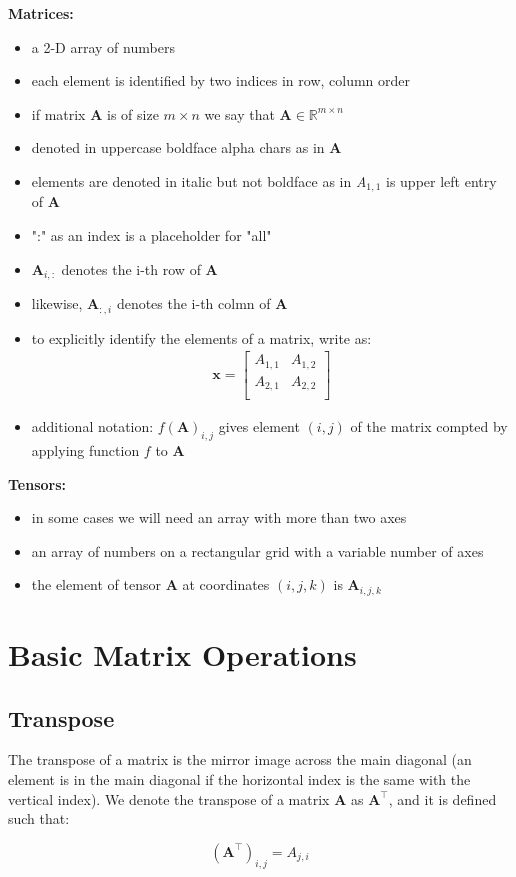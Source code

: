 \documentclass[11pt,twocolumn]{report}
\def\realnumbers{\mathbb{R}}
\begin{document}
\large\textbf{Matrices:}
\begin{itemize}
  \item a 2-D array of numbers
  \item each element is identified by two indices in row, column order
  \item if matrix $\bm{A}$ is of size $m \times n$ we say that $\bm{A} \in
    \realnumbers^{m \times n}$
  \item denoted in uppercase boldface alpha chars as in $\bm{A}$
  \item elements are denoted in italic but not boldface as in
    \textit{A}$_{1,1}$ is upper left entry of $\bm{A}$
  \item ":" as an index is a placeholder for "all"
  \item $\bm{A}_{i,:}$ denotes the i-th row of $\bm{A}$
  \item likewise, $\bm{A}_{:,i}$ denotes the i-th colmn of $\bm{A}$
  \item to explicitly identify the elements of a matrix, write as:
    \begin{gather}
      \bm{x} = 
      \begin{bmatrix}
        A_{1,1} & A_{1, 2}\\
        A_{2,1} & A_{2, 2}\\
      \end{bmatrix}
    \end{gather}
  \item additional notation: $f(\bm{A})_{i, j}$ gives element $(i, j)$ of the
    matrix compted by applying function $f$ to $\bm{A}$
\end{itemize}

\large\textbf{Tensors:}
\begin{itemize}
  \item in some cases we will need an array with more than two axes
  \item an array of numbers on a rectangular grid with a variable number of axes
  \item the element of tensor $\bm{A}$ at coordinates $(i, j, k)$ is
    $\bm{A}_{i, j, k}$
\end{itemize}

\section{Basic Matrix Operations}
\subsection{Transpose}
\begin{flushleft}
  The transpose of a matrix is the mirror image across the main diagonal (an
  element is in the main diagonal if the horizontal index is the same with the
  vertical index). We denote the transpose of a matrix $\bm{A}$ as
  $\bm{A}^\intercal$, and it is defined such that:
\end{flushleft}
\begin{equation}
  (\bm{A}^\intercal)_{i, j} = A_{j, i}
\end{equation}
\end{document}
